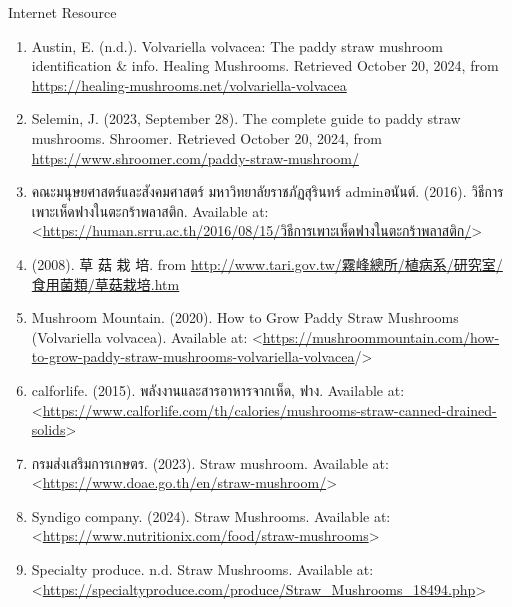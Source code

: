 Internet Resource
\begin{enumerate}
  \item Austin, E. (n.d.). Volvariella volvacea: The paddy straw mushroom identification & info. Healing Mushrooms. Retrieved October 20, 2024, from \href{https://healing-mushrooms.net/volvariella-volvacea}{https://healing-mushrooms.net/volvariella-volvacea}
  \item Selemin, J. (2023, September 28). The complete guide to paddy straw mushrooms. Shroomer. Retrieved October 20, 2024, from \href{https://www.shroomer.com/paddy-straw-mushroom/}{https://www.shroomer.com/paddy-straw-mushroom/}
  \item {\T คณะมนุษยศาสตร์และสังคมศาสตร์ มหาวิทยาลัยราชภัฏสุรินทร์ }admin{\T อนันต์.} (2016). {\T วิธีการเพาะเห็ดฟางในตะกร้าพลาสติก}. Available at: <\href{https://human.srru.ac.th/2016/08/15/วิธีการเพาะเห็ดฟางในตะ/}{https://human.srru.ac.th/2016/08/15/{\T วิธีการเพาะเห็ดฟางในตะกร้าพลาสติก}/}>
  \item (2008). {\fontsize{16}{24}\selectfont 草 菇 栽 培}. from \href{https://web.archive.org/web/20080506175441/http://www.tari.gov.tw/霧峰總所/植病系/研究室/食用菌類/草菇栽培.htm}{http://www.tari.gov.tw/{\fontsize{16}{24}\selectfont 霧峰總所}/{\fontsize{16}{24}\selectfont 植病系}/{\fontsize{16}{24}\selectfont 研究室}/{\fontsize{16}{24}\selectfont 食用菌類}/{\fontsize{16}{24}\selectfont 草菇栽培}.htm}
  \item Mushroom Mountain. (2020). How to Grow Paddy Straw Mushrooms (Volvariella volvacea). Available at: <\href{https://mushroommountain.com/how-to-grow-paddy-straw-mushrooms-volvariella-volvacea}{https://mushroommountain.com/how-to-grow-paddy-straw-mushrooms-volvariella-volvacea}/>
  \item calforlife. (2015). {\T พลังงานและสารอาหารจากเห็ด}, ฟาง. Available at: <\href{https://www.calforlife.com/th/calories/mushrooms-straw-canned-drained-solids}{https://www.calforlife.com/th/calories/mushrooms-straw-canned-drained-solids}>
  \item {\T กรมส่งเสริมการเกษตร}. (2023). Straw mushroom. Available at: <\href{https://www.doae.go.th/en/straw-mushroom/}{https://www.doae.go.th/en/straw-mushroom/}>
  \item Syndigo company. (2024). Straw Mushrooms. Available at: <\href{https://www.nutritionix.com/food/straw-mushrooms}{https://www.nutritionix.com/food/straw-mushrooms}>
  \item Specialty produce. n.d. Straw Mushrooms. Available at: <\href{https://specialtyproduce.com/produce/Straw_Mushrooms_18494.php}{https://specialtyproduce.com/produce/Straw\_Mushrooms\_18494.php}>

\end{enumerate}
